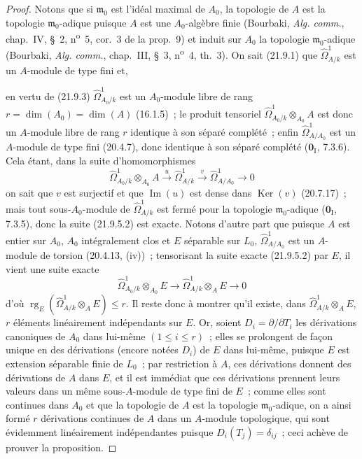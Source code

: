 \begin{proof}
Notons que si $\mathfrak m_0$ est l'idéal maximal de $A_0$, la topologie de
$A$ est la topologie $\mathfrak m_0$-adique puisque $A$ est une
$A_0$-algèbre finie (Bourbaki, \emph{Alg. comm.}, chap.~IV, \S~2,
n\textsuperscript{o}~5, cor.~3 de la prop.~9) et induit sur $A_0$ la topologie
$\mathfrak m_0$-adique (Bourbaki, \emph{Alg. comm.}, chap.~III, \S~3,
n\textsuperscript{o}~4, th.~3). On sait (21.9.1) que
$\widehat\Omega^1_{A/k}$ est un $A$-module de type fini et,

en vertu de (21.9.3) $\widehat\Omega^1_{A_0/k}$ est un $A_0$-module libre de
rang $r=\dim(A_0)=\dim(A)$ (16.1.5)~; le produit tensoriel
$\widehat\Omega^1_{A_0/k}\otimes_{A_0}A$ est donc un $A$-module libre de rang
$r$ identique à son séparé complété~; enfin $\widehat\Omega^1_{A/A_0}$ est
un $A$-module de type fini (20.4.7), donc identique à son séparé complété
($\mathbf 0_{\mathrm I}$, 7.3.6). Cela étant, dans la suite d'homomorphismes
\begin{equation}
\tag{21.9.5.2}
\label{0.21.9.5.2-fr}
  \widehat\Omega^1_{A_0/k}\otimes_{A_0}A
  \xrightarrow{u}\widehat\Omega^1_{A/k}
  \xrightarrow{v}\widehat\Omega^1_{A/A_0}\longrightarrow0
\end{equation}
on sait que $v$ est surjectif et que $\operatorname{Im}(u)$ est dense dans
$\operatorname{Ker}(v)$ (20.7.17)~; mais tout sous-$A_0$-module de
$\widehat\Omega^1_{A/k}$ est fermé pour la topologie $\mathfrak m_0$-adique
($\mathbf 0_{\mathrm I}$, 7.3.5), donc la suite (21.9.5.2) est exacte. Notons
d'autre part que puisque $A$ est entier sur $A_0$, $A_0$ intégralement clos
et $E$ séparable sur $L_0$, $\widehat\Omega^1_{A/A_0}$ est un $A$-module de
torsion (20.4.13, (iv))~; tensorisant la suite exacte (21.9.5.2) par $E$, il
vient une suite exacte
\[
  \widehat\Omega^1_{A_0/k}\otimes_{A_0}E
  \longrightarrow \widehat\Omega^1_{A/k}\otimes_AE\longrightarrow0
\]
d'où $\operatorname{rg}_E(\widehat\Omega^1_{A/k}\otimes_AE)\leqslant r$. Il
reste donc à montrer qu'il existe, dans $\widehat\Omega^1_{A/k}\otimes_AE$,
$r$ éléments linéairement indépendants sur $E$. Or, soient
$D_i=\partial/\partial T_i$ les dérivations canoniques de $A_0$ dans lui-même
$(1\leqslant i\leqslant r)$~; elles se prolongent de façon unique en des
dérivations (encore notées $D_i$) de $E$ dans lui-même, puisque $E$ est
extension séparable finie de $L_0$~; par restriction à $A$, ces dérivations
donnent des dérivations de $A$ dans $E$, et il est immédiat que ces
dérivations prennent leurs valeurs dans un même sous-$A$-module de type fini
de $E$~; comme elles sont continues dans $A_0$ et que la topologie de $A$ est
la topologie $\mathfrak m_0$-adique, on a ainsi formé $r$ dérivations
continues de $A$ dans un $A$-module topologique, qui sont évidemment
linéairement indépendantes puisque $D_i(T_j)=\delta_{ij}$~; ceci achève de
prouver la proposition.
\end{proof}

